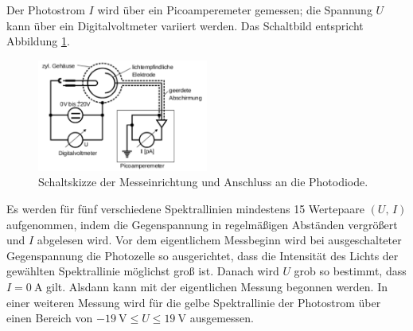 Der Photostrom $I$ wird über ein Picoamperemeter gemessen; die Spannung $U$ kann über ein Digitalvoltmeter variiert werden. 
Das Schaltbild entspricht Abbildung \ref{fig:schaltbild}. 

\begin{figure}[h]
	\centering
	\includegraphics[width=0.5\textwidth]{Bilder/Schaltbild.pdf}
	\caption{Schaltskizze der Messeinrichtung und Anschluss an die Photodiode. \cite{skript}}
	\label{fig:schaltbild}
\end{figure}
Es werden für fünf verschiedene Spektrallinien mindestens 15 Wertepaare $\left(U,\,I\right)$ aufgenommen, indem die Gegenspannung in regelmäßigen Abständen vergrößert und $I$ abgelesen wird.
Vor dem  eigentlichem Messbeginn wird bei ausgeschalteter Gegenspannung die Photozelle so ausgerichtet, dass die Intensität des Lichts der gewählten Spektrallinie möglichst groß ist. 
Danach wird $U$ grob so bestimmt, dass $I=\SI{0}{\ampere}$ gilt. 
Alsdann kann mit der eigentlichen Messung begonnen werden.
In einer weiteren Messung wird für die gelbe Spektrallinie der Photostrom über einen Bereich von $\SI{-19}{\volt}\leqslant U\leqslant \SI{19}{\volt}$ ausgemessen.
\newpage